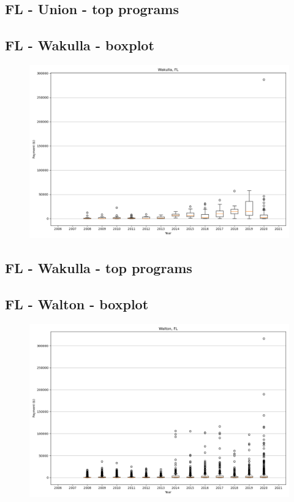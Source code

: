 \subsection*{FL - Union - top programs}

\newpage
\subsection*{FL - Wakulla - boxplot}
\begin{figure}[h]
\centering
\includegraphics[width=7in]{../output/boxplots/counties/Wakulla-FL_boxplot.png}
\end{figure}


\subsection*{FL - Wakulla - top programs}

\newpage
\subsection*{FL - Walton - boxplot}
\begin{figure}[h]
\centering
\includegraphics[width=7in]{../output/boxplots/counties/Walton-FL_boxplot.png}
\end{figure}


